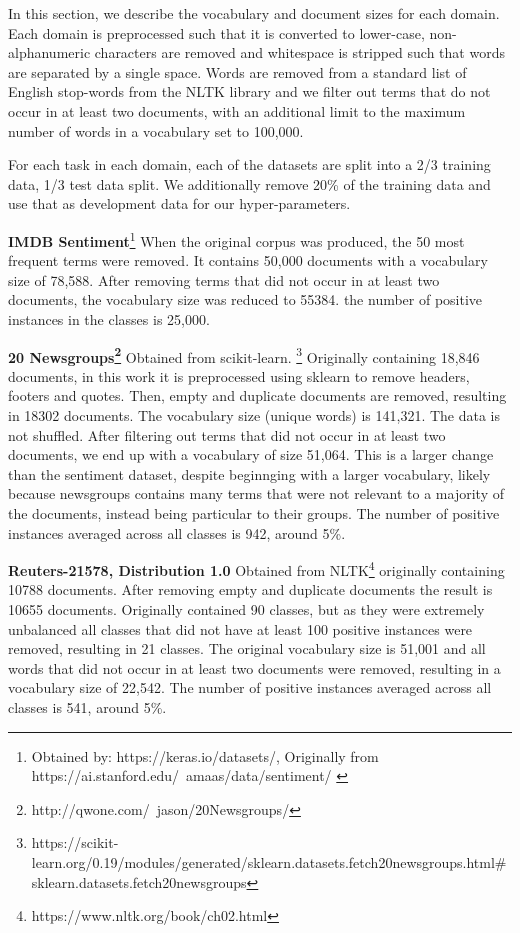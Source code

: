 In this section, we describe the vocabulary and document sizes for each domain. Each domain is preprocessed such that it is converted to lower-case,  non-alphanumeric characters are removed and whitespace is stripped such that words are separated by a single space. Words are removed from a standard list of English stop-words from the NLTK library \cite{Bird} and we filter out terms that do not occur in at least two documents, with an additional limit to the maximum number of words in a vocabulary set to 100,000. 

For each task in each domain,  each of the datasets are split into a 2/3 training data, 1/3 test data split.  We additionally remove 20\% of the training data and use that as development data for our hyper-parameters. 


\textbf{IMDB Sentiment}\footnote{Obtained by: https://keras.io/datasets/, Originally from https://ai.stanford.edu/~amaas/data/sentiment/ \cite{Maas2011a}} When the original corpus was produced, the 50 most frequent terms were removed. It contains 50,000 documents with a vocabulary size of 78,588. After removing terms that did not occur in at least two documents, the vocabulary size was reduced to 55384.  the number of positive instances in the classes is 25,000.


\textbf{20 Newsgroups\footnote{http://qwone.com/~jason/20Newsgroups/}} Obtained from scikit-learn. \footnote{https://scikit-learn.org/0.19/modules/generated/sklearn.datasets.fetch\textunderscore20newsgroups.html\#sklearn.datasets.fetch\textunderscore20newsgroups} Originally containing 18,846 documents, in this work it is preprocessed using sklearn to remove headers, footers and quotes. Then, empty and duplicate documents are removed, resulting in 18302 documents. The vocabulary size (unique words) is 141,321. The data is not shuffled. After filtering out terms that did not occur in at least two documents, we end up with a vocabulary of size 51,064. This is a larger change  than the sentiment dataset, despite beginnging with a larger vocabulary, likely because newsgroups contains many terms that were not relevant to a majority of the documents, instead being particular to their groups. The number of positive instances averaged across all classes is 942, around 5\%.

\textbf{Reuters-21578, Distribution 1.0} Obtained from NLTK\footnote{https://www.nltk.org/book/ch02.html} originally containing 10788 documents. After removing empty and duplicate documents the result is 10655 documents. Originally contained 90 classes, but as they were extremely unbalanced all classes that did not have at least 100 positive instances were removed, resulting in 21 classes. The original vocabulary size is 51,001 and all words that did not occur in at least two documents were removed, resulting in a vocabulary size of 22,542. The number of positive instances averaged across all classes is 541, around 5\%. 


